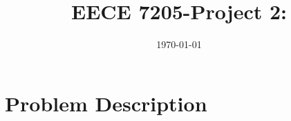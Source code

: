 \documentclass{article}
\title{EECE 7205-Project 2: }
\author{}
\date{\today}
\begin{document}
\maketitle
\section{Problem Description}
\end{document}
